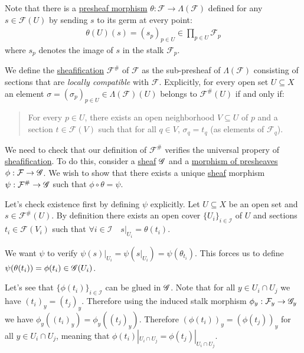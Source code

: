 \documentclass[../../../main]{subfiles}
\begin{document}
\begin{construction}
  Note that there is a \hyperref[def:presheaf]{presheaf morphism} \(\theta: \mathcal{F} \to \Lambda(\mathcal{F})\) defined for any \(s \in \mathcal{F}(U)\) by sending \(s\) to its germ at every point:
  \begin{align*}
    \theta(U)(s) = (s_{p})_{p \in U} \in \prod_{p \in U} \mathcal{F}_{p}
  \end{align*}
  where \(s_{p}\) denotes the image of \(s\) in the stalk \(\mathcal{F}_{p}\).

  We define the \hyperref[def:sheafification]{sheafification} \(\mathcal{F}^{\#}\) of \(\mathcal{F}\) as the sub-presheaf of \(\Lambda(\mathcal{F})\) consisting of sections that are \textit{locally compatible} with \(\mathcal{F}\).
  Explicitly, for every open set \(U \subseteq X\) an element \(\sigma = (\sigma_{p})_{p \in U} \in \Lambda(\mathcal{F})(U)\) belongs to \(\mathcal{F}^{\#}(U)\) if and only if:
  \begin{quote}
    For every \(p \in U\), there exists an open neighborhood \(V \subseteq U\) of \(p\) and a section \(t \in \mathcal{F}(V)\) such that for all \(q \in V\), \(\sigma_{q} = t_{q}\) (as elements of \(\mathcal{F}_{q}\)).
  \end{quote}

  We need to check that our definition of \(\mathcal{F}^{\#}\) verifies the universal propery of \hyperref[def:sheafification]{sheafification}.
  To do this, consider a \hyperref[def:set-valued-sheaf]{sheaf} \(\mathscr{G}\) and a \hyperref[def:presheaf]{morphism of presheaves} \(\phi: \mathcal{F} \to \mathscr{G}\).
  We wish to show that there exists a unique \hyperref[def:sheaf]{sheaf} morphism \(\psi: \mathcal{F}^{\#} \to \mathscr{G}\) such that \(\phi \circ \theta = \psi\).

  Let's check existence first by defining \(\psi\) explicitly.
  Let \(U \subseteq X\) be an open set and \(s \in \mathcal{F}^{\#}(U)\).
  By definition there exists an open cover \(\{U_{i}\}_{i \in \mathcal{I}}\) of \(U\) and sections \(t_{i} \in \mathcal{F}(V_{i})\) such that \(\forall i \in \mathcal{I} \quad s|_{U_{i}} = \theta(t_{i})\).

  We want \(\psi\) to verify \(\psi(s)|_{U_{i}} = \psi(s|_{U_{i}}) = \psi(\theta_{t_{i}})\). This forces us to define \(\psi(\theta(t_{i})) = \phi(t_{i}) \in \mathscr{G}(U_{i})\).

  Let's see that \(\{\phi(t_{i})\}_{i \in \mathcal{I}}\) can be glued in \(\mathscr{G}\).
  Note that for all \(y \in U_{i} \cap U_{j}\) we have \((t_{i})_{y} = (t_{j})_{y}\).
  Therefore using the induced stalk morphism \(\phi_{y}: \mathcal{F}_{y} \to \mathscr{G}_{y}\) we have \(\phi_{y}((t_{i})_{y}) = \phi_{y}((t_{j})_{y})\).
  Therefore \((\phi(t_{i}))_{y} = (\phi(t_{j}))_{y}\) for all \(y \in U_{i} \cap U_{j}\), meaning that \(\phi(t_{i})|_{U_{i} \cap U_{j}} = \phi(t_{j})|_{U_{i} \cap U_{j}}\).


\end{construction}
\end{document}
